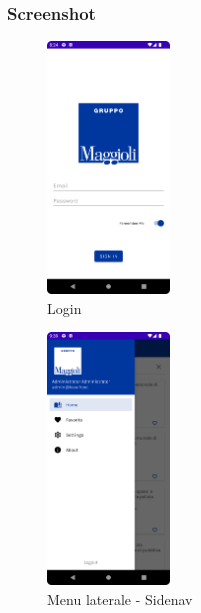 \subsubsection*{Screenshot}
\begin{multicols}{3}
            \begin{figure}[H]
                \centering
                \includegraphics[width=0.29\textwidth]{img/login.png}
                \caption{Login}
                \label{login-android}
            \end{figure}

            \begin{figure}[H]
                \centering
                \includegraphics[width=0.29\textwidth]{img/sidenav.png}
                \caption{Menu laterale - Sidenav}
                \label{sidenav-android}
            \end{figure}
            

\end{multicols}
